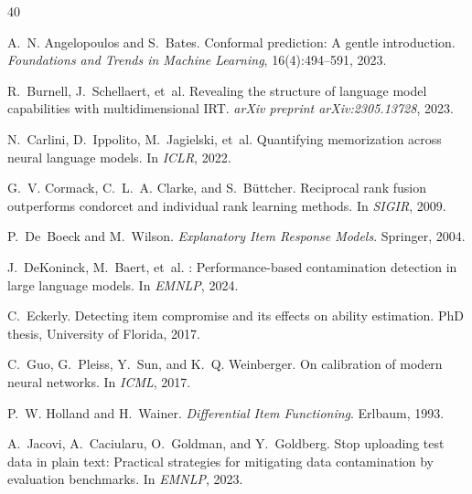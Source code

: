 \documentclass[11pt,a4paper]{article}
\begin{document}

\begin{thebibliography}{40}

A.~N. Angelopoulos and S.~Bates.
\newblock Conformal prediction: A gentle introduction.
\newblock \emph{Foundations and Trends in Machine Learning}, 16(4):494--591, 2023.

R.~Burnell, J.~Schellaert, et~al.
\newblock Revealing the structure of language model capabilities with multidimensional {IRT}.
\newblock \emph{arXiv preprint arXiv:2305.13728}, 2023.

N.~Carlini, D.~Ippolito, M.~Jagielski, et~al.
\newblock Quantifying memorization across neural language models.
\newblock In \emph{ICLR}, 2022.

G.~V. Cormack, C.~L.~A. Clarke, and S.~B{\"u}ttcher.
\newblock Reciprocal rank fusion outperforms condorcet and individual rank learning methods.
\newblock In \emph{SIGIR}, 2009.

P.~De~Boeck and M.~Wilson.
\newblock \emph{Explanatory Item Response Models}.
\newblock Springer, 2004.

J.~DeKoninck, M.~Baert, et~al.
: Performance-based contamination detection in large language models.
\newblock In \emph{EMNLP}, 2024.

C.~Eckerly.
\newblock Detecting item compromise and its effects on ability estimation.
\newblock PhD thesis, University of Florida, 2017.

C.~Guo, G.~Pleiss, Y.~Sun, and K.~Q. Weinberger.
\newblock On calibration of modern neural networks.
\newblock In \emph{ICML}, 2017.

P.~W. Holland and H.~Wainer.
\newblock \emph{Differential Item Functioning}.
\newblock Erlbaum, 1993.

A.~Jacovi, A.~Caciularu, O.~Goldman, and Y.~Goldberg.
\newblock Stop uploading test data in plain text: Practical strategies for mitigating data contamination by evaluation benchmarks.
\newblock In \emph{EMNLP}, 2023.


\end{thebibliography}
\end{document}
